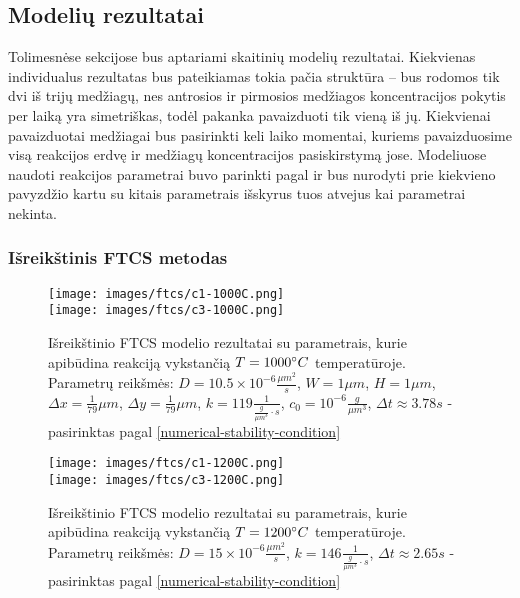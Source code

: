 \newpage
\subsection{Modelių rezultatai}

Tolimesnėse sekcijose bus aptariami skaitinių modelių rezultatai. Kiekvienas individualus rezultatas bus pateikiamas tokia pačia struktūra -- bus rodomos tik dvi iš trijų medžiagų, nes antrosios ir pirmosios medžiagos koncentracijos pokytis per laiką yra simetriškas, todėl pakanka pavaizduoti tik vieną iš jų. Kiekvienai pavaizduotai medžiagai bus pasirinkti keli laiko momentai, kuriems pavaizduosime visą reakcijos erdvę ir medžiagų koncentracijos pasiskirstymą jose. Modeliuose naudoti reakcijos parametrai buvo parinkti pagal \cite{mackeviciusCloserLookComputer2012} ir bus nurodyti prie kiekvieno pavyzdžio kartu su kitais parametrais išskyrus tuos atvejus kai parametrai nekinta.

\subsubsection{Išreikštinis FTCS metodas}

\begin{figure}[h!]
  \centering
  \texttt{[image: images/ftcs/c1-1000C.png]} \\ 
  \texttt{[image: images/ftcs/c3-1000C.png]}
  \caption{Išreikštinio FTCS modelio rezultatai su parametrais, kurie apibūdina reakciją vykstančią $T=1000\degree C$ temperatūroje. Parametrų reikšmės: $D = 10.5\times 10^{-6} \frac{\mu m^2}{s}$, $W = 1\mu m$, $H = 1\mu m$, $\Delta x = \frac{1}{79}\mu m$, $\Delta y = \frac{1}{79} \mu m$, $k = 119 \frac{1}{ \frac{g}{\mu m^3}\cdot s}$, $c_0 = 10^{-6} \frac{g}{\mu m^3}$, $\Delta t \approx 3.78s$ - pasirinktas pagal \eqref{numerical-stability-condition} }
  \label{fig:ftcs-result-T-1000}
\end{figure}

\begin{figure}[h!]
  \centering
  \texttt{[image: images/ftcs/c1-1200C.png]} \\ 
  \texttt{[image: images/ftcs/c3-1200C.png]}
  \caption{Išreikštinio FTCS modelio rezultatai su parametrais, kurie apibūdina reakciją vykstančią $T=1200\degree C$ temperatūroje. Parametrų reikšmės: $D = 15\times 10^{-6} \frac{\mu m^2}{s}$, $k = 146 \frac{1}{ \frac{g}{\mu m^3}\cdot s}$, $\Delta t \approx 2.65s$ - pasirinktas pagal \eqref{numerical-stability-condition} }
  \label{fig:ftcs-result-T-1200}
\end{figure}

